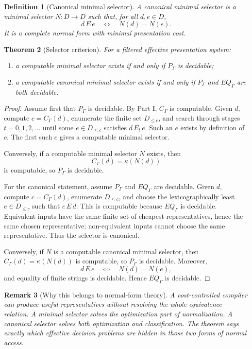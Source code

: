 \documentclass[11pt]{article}
\newtheorem{theorem}{Theorem}[section]
\newtheorem{definition}[theorem]{Definition}
\newtheorem{remark}[theorem]{Remark}
\begin{document}
\begin{definition}[Canonical minimal selector]
A canonical minimal selector is a minimal selector \(N:D\to D\) such that, for all \(d,e\in D\),
\[
d\,E\,e
\quad\Longleftrightarrow\quad
N(d)=N(e).
\]
It is a complete normal form with minimal presentation cost.
\end{definition}

\begin{theorem}[Selector criterion]
For a filtered effective presentation system:
\begin{enumerate}[label=(\roman*)]
\item a computable minimal selector exists if and only if \(P_\Gamma\) is decidable;
\item a computable canonical minimal selector exists if and only if \(P_\Gamma\) and \(EQ_\Gamma\) are both decidable.
\end{enumerate}
\end{theorem}

\begin{proof}
Assume first that \(P_\Gamma\) is decidable.  By Part I, \(C_\Gamma\) is computable.  Given \(d\), compute \(c=C_\Gamma(d)\), enumerate the finite set \(D_{\leq c}\), and search through stages \(t=0,1,2,\ldots\) until some \(e\in D_{\leq c}\) satisfies \(d\,E_t\,e\).  Such an \(e\) exists by definition of \(c\).  The first such \(e\) gives a computable minimal selector.

Conversely, if a computable minimal selector \(N\) exists, then
\[
C_\Gamma(d)=\kappa(N(d))
\]
is computable, so \(P_\Gamma\) is decidable.

For the canonical statement, assume \(P_\Gamma\) and \(EQ_\Gamma\) are decidable.  Given \(d\), compute \(c=C_\Gamma(d)\), enumerate \(D_{\leq c}\), and choose the lexicographically least \(e\in D_{\leq c}\) such that \(e\,E\,d\).  This is computable because \(EQ_\Gamma\) is decidable.  Equivalent inputs have the same finite set of cheapest representatives, hence the same chosen representative; non-equivalent inputs cannot choose the same representative.  Thus the selector is canonical.

Conversely, if \(N\) is a computable canonical minimal selector, then \(C_\Gamma(d)=\kappa(N(d))\) is computable, so \(P_\Gamma\) is decidable.  Moreover,
\[
d\,E\,e
\quad\Longleftrightarrow\quad
N(d)=N(e),
\]
and equality of finite strings is decidable.  Hence \(EQ_\Gamma\) is decidable.
\end{proof}

\begin{remark}[Why this belongs to normal-form theory]
A cost-controlled compiler can produce useful representatives without resolving the whole equivalence relation.  A minimal selector solves the optimization part of normalization.  A canonical selector solves both optimization and classification.  The theorem says exactly which effective decision problems are hidden in those two forms of normal access.
\end{remark}
\end{document}

